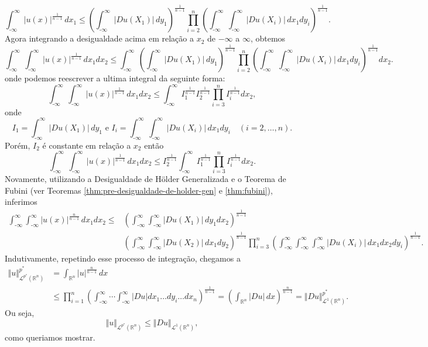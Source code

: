 \documentclass[a4paper, 11pt]{book}
\theoremstyle{definition}
\newcommand{\m}{\text{-}}
\newcommand{\bR}{\mathbb{R}}
\newcommand{\cL}{\mathcal{L}}
\begin{document}
\begin{prf}
    \[
        \int_{\m\infty}^{\infty} |u(x)|^{\frac{1}{n-1}} \,dx_1 \leqslant \left( \int_{\m\infty}^{\infty} |Du(X_1)| \,dy_1 \right)^{\frac{1}{n-1}}\prod_{i=2}^n \left(\int_{\m\infty}^{\infty}   \int_{\m\infty}^{\infty} |Du(X_i)| \, dx_1dy_i\right)^{\frac{1}{n-1}}.
    \]
    Agora integrando a desigualdade acima em relação a $x_2$ de $-\infty$ a $\infty$, obtemos
    \[
        \int_{\m\infty}^{\infty}\int_{\m\infty}^{\infty} |u(x)|^{\frac{1}{n-1}} \,dx_1dx_2 \leqslant \int_{\m\infty}^{\infty}\!\!\left( \int_{\m\infty}^{\infty} |Du(X_1)| \,dy_1 \right)^{\frac{1}{n-1}}\prod_{i=2}^n \left(\int_{\m\infty}^{\infty} \!\int_{\m\infty}^{\infty} |Du(X_i)| \, dx_1dy_i\right)^{\frac{1}{n-1}} dx_2.
    \]
    onde podemos reescrever a ultima integral da seguinte forma:
    \[
        \int_{\m\infty}^{\infty}\int_{\m\infty}^{\infty} |u(x)|^{\frac{1}{n-1}} \,dx_1dx_2 \leqslant \int_{\m\infty}^{\infty} I_1^{\frac{1}{n-1}}I_2^{\frac{1}{n-1}}\prod_{i=3}^n I_i^{\frac{1}{n-1}} dx_2,
    \]
    onde
    \[
        I_1 = \int_{\m\infty}^{\infty} |Du(X_1)| \,dy_1 \text{ e } I_i = \int_{\m\infty}^{\infty} \!\int_{\m\infty}^{\infty} |Du(X_i)| \, dx_1dy_i \quad(i = 2,\dots,n).
    \]
    Porém, $I_2$ é constante em relação a $x_2$ então
    \[
        \int_{\m\infty}^{\infty}\int_{\m\infty}^{\infty} |u(x)|^{\frac{1}{n-1}} \,dx_1dx_2 \leqslant I_2^{\frac{1}{n-1}}\int_{\m\infty}^{\infty} I_1^{\frac{1}{n-1}}\prod_{i=3}^n I_i^{\frac{1}{n-1}} dx_2.
    \]
    Novamente, utilizando a Desigualdade de Hölder Generalizada e o Teorema de Fubini (ver Teoremas \ref{thm:pre-desigualdade-de-holder-gen} e \ref{thm:fubini}), inferimos
    {\small
    \[
        \begin{aligned}
            \int_{\m\infty}^{\infty}\int_{\m\infty}^{\infty} |u(x)|^{\frac{n}{n-1}} \,dx_1dx_2 \leqslant &\left( \int_{\m\infty}^{\infty} \int_{\m\infty}^{\infty} |Du(X_1)| \,dy_1 dx_2 \right)^{\frac{1}{n-1}}\\ &\left( \int_{\m\infty}^{\infty} \int_{\m\infty}^{\infty} |Du(X_2)| \,dx_1 dy_2 \right)^{\frac{1}{n-1}} \prod_{i=3}^n \left( \int_{\m\infty}^{\infty}\int_{\m\infty}^{\infty}\int_{\m\infty}^{\infty} |Du(X_i)| \,dx_1dx_2dy_i \right)^{\frac{1}{n-1}} \!\!.
        \end{aligned}
    \]\!}
    Indutivamente, repetindo esse processo de integração, chegamos a
    \[
        \begin{aligned}
            \Vert u \Vert_{\cL^{p^*}(\bR^n)}^{p^*} &= \int_{\bR^n} |u|^{\frac{n}{n-1}} \, dx \\
            &\leqslant \prod_{i=1}^n \left( \int_{\m\infty}^{\infty} \cdots \int_{\m\infty}^\infty |Du| dx_1\dots dy_i \dots dx_n \right)^{\frac{1}{n-1}}
            = \left(\int_{\bR^n} |Du|\,dx\right)^{\frac{n}{n-1}} = \Vert Du \Vert_{\cL^1(\bR^n)}^{p^*}.
        \end{aligned}
    \]
    Ou seja,
    \begin{equation} \label{eq:desigualdadegnss}
        \Vert u \Vert_{\cL^{p^*}(\bR^n)} \leqslant\Vert Du \Vert_{\cL^1(\bR^n)},
    \end{equation}
    como queriamos mostrar.


\end{prf}
\end{document}
